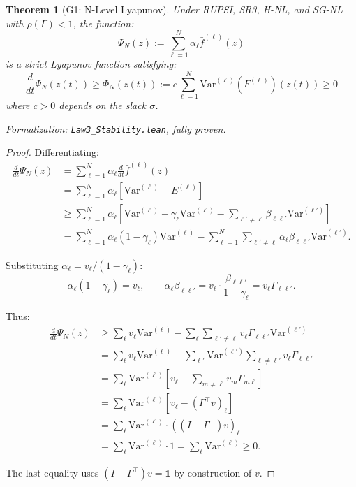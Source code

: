 \documentclass[12pt]{article}
\newtheorem{theorem}{Theorem}[section]
\newcommand{\Var}{\mathrm{Var}}
\begin{document}
\begin{theorem}[G1: N-Level Lyapunov]
\label{thm:g1}
Under RUPSI, SR3, H-NL, and SG-NL with $\rho(\Gamma) < 1$, the function:
\[
\Psi_N(z) := \sum_{\ell=1}^N \alpha_\ell \bar{f}^{(\ell)}(z)
\]
is a strict Lyapunov function satisfying:
\[
\frac{d}{dt} \Psi_N(z(t)) \geq \Phi_N(z(t)) := c \sum_{\ell=1}^N \Var^{(\ell)}(F^{(\ell)})(z(t)) \geq 0
\]
where $c > 0$ depends on the slack $\sigma$.
\end{theorem}
\noindent\textit{Formalization: \texttt{Law3\_Stability.lean}, fully proven.}

\begin{proof}
Differentiating:
\begin{align*}
\frac{d}{dt} \Psi_N(z) &= \sum_{\ell=1}^N \alpha_\ell \frac{d}{dt} \bar{f}^{(\ell)}(z) \\
&= \sum_{\ell=1}^N \alpha_\ell \left[ \Var^{(\ell)} + E^{(\ell)} \right] \\
&\geq \sum_{\ell=1}^N \alpha_\ell \left[ \Var^{(\ell)} - \gamma_\ell \Var^{(\ell)} - \sum_{\ell' \neq \ell} \beta_{\ell\ell'} \Var^{(\ell')} \right] \\
&= \sum_{\ell=1}^N \alpha_\ell (1 - \gamma_\ell) \Var^{(\ell)} - \sum_{\ell=1}^N \sum_{\ell' \neq \ell} \alpha_\ell \beta_{\ell\ell'} \Var^{(\ell')}.
\end{align*}

Substituting $\alpha_\ell = v_\ell / (1 - \gamma_\ell)$:
\[
\alpha_\ell (1 - \gamma_\ell) = v_\ell, \qquad \alpha_\ell \beta_{\ell\ell'} = v_\ell \cdot \frac{\beta_{\ell\ell'}}{1 - \gamma_\ell} = v_\ell \Gamma_{\ell\ell'}.
\]

Thus:
\begin{align*}
\frac{d}{dt} \Psi_N(z) &\geq \sum_{\ell} v_\ell \Var^{(\ell)} - \sum_{\ell} \sum_{\ell' \neq \ell} v_\ell \Gamma_{\ell\ell'} \Var^{(\ell')} \\
&= \sum_{\ell} v_\ell \Var^{(\ell)} - \sum_{\ell'} \Var^{(\ell')} \sum_{\ell \neq \ell'} v_\ell \Gamma_{\ell\ell'} \\
&= \sum_{\ell} \Var^{(\ell)} \left[ v_\ell - \sum_{m \neq \ell} v_m \Gamma_{m\ell} \right] \\
&= \sum_{\ell} \Var^{(\ell)} \left[ v_\ell - (\Gamma^\top v)_\ell \right] \\
&= \sum_{\ell} \Var^{(\ell)} \cdot ((I - \Gamma^\top) v)_\ell \\
&= \sum_{\ell} \Var^{(\ell)} \cdot 1 = \sum_{\ell} \Var^{(\ell)} \geq 0.
\end{align*}

The last equality uses $(I - \Gamma^\top) v = \mathbf{1}$ by construction of $v$.
\end{proof}
\end{document}
